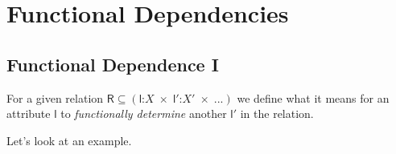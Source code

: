 \chapter{Functional Dependencies}


\section{Functional Dependence I}


For a given relation 
$\textsf{R} \subseteq 
(\textsf{l}\text{:}X \;\times\; 
\textsf{l}'\text{:}X' \;\times\; 
...)
$ we define what it means for 
an attribute $\textsf{l}$ to \textit{functionally determine} 
another $\textsf{l}'$ in the relation. 


Let's look at an example.

\frmrule


